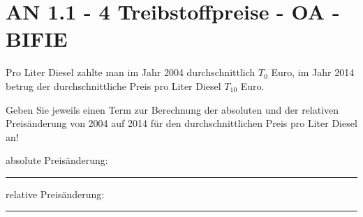 \section{AN 1.1 - 4 Treibstoffpreise - OA - BIFIE}

\begin{beispiel}[AN 1.1]{1} %
Pro Liter Diesel zahlte man im Jahr 2004 durchschnittlich $T_0$ Euro, im Jahr 2014 betrug der durchschnittliche Preis pro Liter Diesel $T_{10}$ Euro. 

\leer

Geben Sie jeweils einen Term zur Berechnung der absoluten und der relativen Preisänderung von 2004 auf 2014 für den durchschnittlichen Preis pro Liter Diesel an! 

\leer

absolute Preisänderung:\rule{5cm}{0.3pt}
\leer

relative Preisänderung:\rule{5cm}{0.3pt}


\end{beispiel}